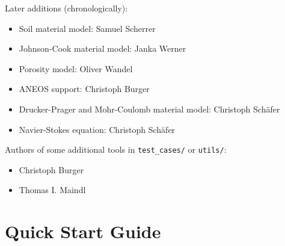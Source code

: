 \documentclass[10pt,fleqn,twoside]{article}
\begin{document}
Later additions (chronologically):
\begin{itemize}
 \item Soil material model: Samuel Scherrer
 \item Johnson-Cook material model: Janka Werner
 \item Porosity model: Oliver Wandel
 \item ANEOS support: Christoph Burger
 \item Drucker-Prager and Mohr-Coulomb material model: Christoph Schäfer
 \item Navier-Stokes equation: Christoph Schäfer
\end{itemize}

Authors of some additional tools in \verb|test_cases/| or \verb|utils/|:
\begin{itemize}
 \item Christoph Burger
 \item Thomas I. Maindl
\end{itemize}







\section{Quick Start Guide}
\end{document}
